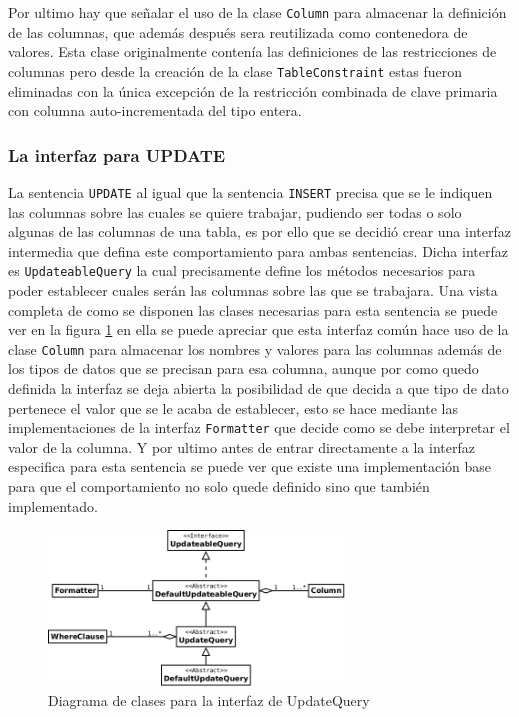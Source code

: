 Por ultimo hay que señalar el uso de la clase \verb=Column= para almacenar la definición de las columnas, que además después sera reutilizada como contenedora de valores. Esta clase originalmente contenía las definiciones de las restricciones de columnas pero desde la creación de la clase \verb=TableConstraint= estas fueron eliminadas con la única excepción de la restricción combinada de clave primaria con columna  auto-incrementada del tipo entera.
%
\subsubsection{La interfaz para UPDATE}
La sentencia \verb=UPDATE= al igual que la sentencia \verb=INSERT= precisa que se le indiquen las columnas sobre las cuales se quiere trabajar, pudiendo ser todas o solo algunas de las columnas de una tabla, es por ello que se decidió crear una interfaz intermedia que defina este comportamiento para ambas sentencias. Dicha interfaz es \verb=UpdateableQuery= la cual precisamente define los métodos necesarios para poder establecer cuales serán las columnas sobre las que se trabajara. Una vista completa de como se disponen las clases necesarias para esta sentencia se puede ver en la figura \ref{fig:dc-updatequery} en ella se puede apreciar que esta interfaz común hace uso de la clase \verb=Column= para almacenar los nombres y valores para las columnas además de los tipos de datos que se precisan para esa columna, aunque por como quedo definida la interfaz se deja abierta la posibilidad de que \jj decida a que tipo de dato pertenece el valor que se le acaba de establecer, esto se hace mediante las implementaciones de la interfaz \verb=Formatter= que decide como se debe interpretar el valor de la columna. Y por ultimo antes de entrar directamente a la interfaz especifica para esta sentencia se puede ver que existe una implementación base para que el comportamiento no solo quede definido sino que también implementado. 
%
\begin{figure}[h]
  \centering
    \includegraphics[width=0.7\textwidth]{figuras/jdbgm-dc-update.png}
  \caption{Diagrama de clases para la interfaz de UpdateQuery}
  \label{fig:dc-updatequery}
\end{figure}

